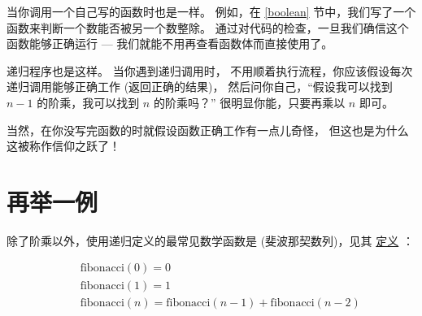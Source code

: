 当你调用一个自己写的函数时也是一样。
例如，在 \ref{boolean} 节中，我们写了一个  函数来判断一个数能否被另一个数整除。
通过对代码的检查，一旦我们确信这个函数能够正确运行 --- 我们就能不用再查看函数体而直接使用了。


递归程序也是这样。
当你遇到递归调用时， 不用顺着执行流程，你应该假设每次递归调用能够正确工作 (返回正确的结果)， 然后问你自己，``假设我可以找到 $n-1$ 的阶乘，我可以找到 $n$ 的阶乘吗？''
很明显你能，只要再乘以 $n$ 即可。


当然，在你没写完函数的时就假设函数正确工作有一点儿奇怪， 但这也是为什么这被称作信仰之跃了！


\section{再举一例}
\label{one.more.example}

  


除了阶乘以外，使用递归定义的最常见数学函数是  (斐波那契数列)，见其 \href{http://en.wikipedia.org/wiki/Fibonacci_number}{定义} ：


%
\begin{eqnarray*}
&& \mathrm{fibonacci}(0) = 0 \\
&& \mathrm{fibonacci}(1) = 1 \\
&& \mathrm{fibonacci}(n) = \mathrm{fibonacci}(n-1) + \mathrm{fibonacci}(n-2)
\end{eqnarray*}

